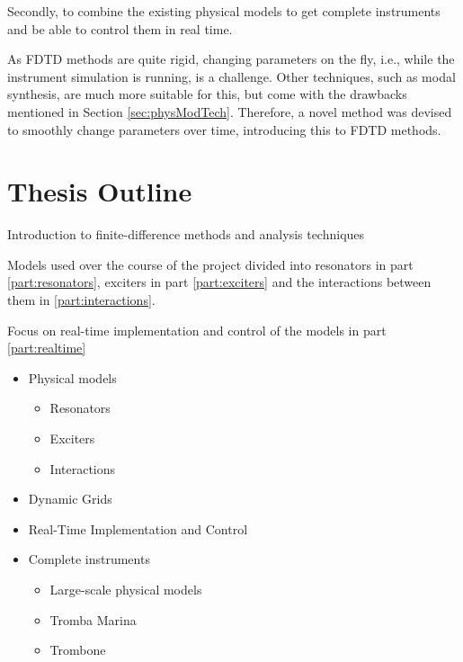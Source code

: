 Secondly, to combine the existing physical models to get complete instruments and be able to control them in real time.

As FDTD methods are quite rigid, changing parameters on the fly, i.e., while the instrument simulation is running, is a challenge.  Other techniques, such as modal synthesis, are much more suitable for this, but come with the drawbacks mentioned in Section \ref{sec:physModTech}. Therefore, a novel method was devised to smoothly change parameters over time, introducing this to FDTD methods. 


\section{Thesis Outline}
Introduction to finite-difference methods and analysis techniques

Models used over the course of the project divided into resonators in part \ref{part:resonators}, exciters in part \ref{part:exciters} and the interactions between them in \ref{part:interactions}.

Focus on real-time implementation and control of the models in part \ref{part:realtime}
\begin{itemize}
    \item Physical models
    \begin{itemize}
        \item Resonators
        \item Exciters
        \item Interactions
    \end{itemize}
    \item Dynamic Grids
    \item Real-Time Implementation and Control
    \item Complete instruments
    \begin{itemize}
        \item Large-scale physical models
        \item Tromba Marina
        \item Trombone
    \end{itemize}
\end{itemize}